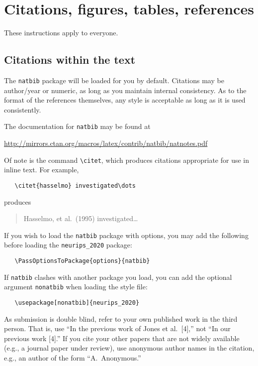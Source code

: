 \documentclass{article}
\begin{document}
\section{Citations, figures, tables, references}
\label{others}

These instructions apply to everyone.

\subsection{Citations within the text}

The \verb+natbib+ package will be loaded for you by default.  Citations may be
author/year or numeric, as long as you maintain internal consistency.  As to the
format of the references themselves, any style is acceptable as long as it is
used consistently.

The documentation for \verb+natbib+ may be found at
\begin{center}
  \url{http://mirrors.ctan.org/macros/latex/contrib/natbib/natnotes.pdf}
\end{center}
Of note is the command \verb+\citet+, which produces citations appropriate for
use in inline text.  For example,
\begin{verbatim}
   \citet{hasselmo} investigated\dots
\end{verbatim}
produces
\begin{quote}
  Hasselmo, et al.\ (1995) investigated\dots
\end{quote}

If you wish to load the \verb+natbib+ package with options, you may add the
following before loading the \verb+neurips_2020+ package:
\begin{verbatim}
   \PassOptionsToPackage{options}{natbib}
\end{verbatim}

If \verb+natbib+ clashes with another package you load, you can add the optional
argument \verb+nonatbib+ when loading the style file:
\begin{verbatim}
   \usepackage[nonatbib]{neurips_2020}
\end{verbatim}

As submission is double blind, refer to your own published work in the third
person. That is, use ``In the previous work of Jones et al.\ [4],'' not ``In our
previous work [4].'' If you cite your other papers that are not widely available
(e.g., a journal paper under review), use anonymous author names in the
citation, e.g., an author of the form ``A.\ Anonymous.''
\end{document}
